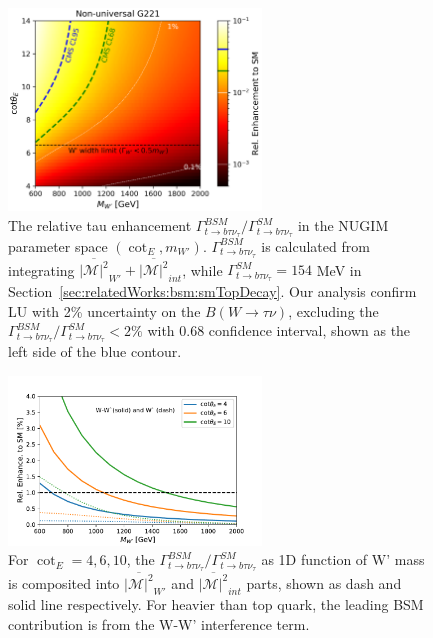 \begin{figure}
    \centering
    \includegraphics[width=0.6\textwidth]{chapters/RelatedWorks/sectionBSM/figures/RelEnhance.png} 
    \caption{The relative tau enhancement $ \Gamma_{t\to b \tau \nu_\tau}^{BSM} / \Gamma_{t\to b \tau \nu_\tau}^{SM} $ in the NUGIM parameter space $(\cot_E, m_{W'})$. $\Gamma_{t\to b \tau \nu_\tau}^{BSM} $ is calculated from integrating $\overline{ |\mathcal{M}|^2 } _{W'} +  \overline{ |\mathcal{M}|^2 } _{int}$, while $\Gamma_{t\to b \tau \nu_\tau}^{SM}=154$ MeV in Section~\ref{sec:relatedWorks:bsm:smTopDecay}.  Our analysis confirm LU with 2\% uncertainty on the $B(W\to \tau \nu)$, excluding the $ \Gamma_{t\to b \tau \nu_\tau}^{BSM} / \Gamma_{t\to b \tau \nu_\tau}^{SM} <2\% $ with 0.68 confidence interval, shown as the left side of the blue contour.}
    \label{fig:relatedWorks:bsm:WPrime:tauEnhancement}
\end{figure}


\begin{figure}
    \centering
    \includegraphics[width=0.6\textwidth]{chapters/RelatedWorks/sectionBSM/figures/RelEnhance1D.pdf} 
    \caption{For $\cot_E=4,6,10$, the $\Gamma_{t\to b \tau \nu_\tau}^{BSM}/  \Gamma_{t\to b \tau \nu_\tau}^{SM} $ as 1D function of W' mass is composited into $\overline{ |\mathcal{M}|^2 } _{W'} $ and $\overline{ |\mathcal{M}|^2 } _{int}$  parts, shown as dash and solid line respectively. For \PWpr heavier than top quark, the leading BSM contribution is from the W-W' interference term. }
    \label{fig:relatedWorks:bsm:WPrime:tauEnhancement1d}
\end{figure}



